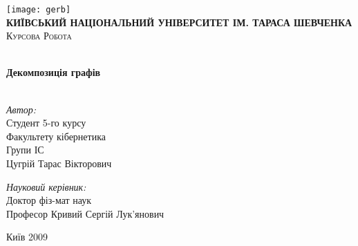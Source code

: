 \begin{titlepage}
  \begin{center}
    
    \texttt{[image: gerb]}\\[1cm]
    
    \textsc{\LARGE \bfseries \MakeUppercase{Київський національний університет ім. Тараса Шевченка}}\\[1.5cm]
    \textsc{\Large Курсова Робота}

    \HRule \\[0.4cm]
           { \huge \bfseries Декомпозиція графів}\\[0.4cm]
           
           \HRule \\[1.5cm]
           
           \begin{minipage}{0.45\textwidth}
             \begin{flushleft} \large
               \emph{Автор:}\\
               Студент 5-го курсу\\
               Факультету кібернетика\\
               Групи ІС\\
               {Ц}угрій {Т}арас {В}ікторович 
             \end{flushleft}
           \end{minipage}
           \begin{minipage}{0.5\textwidth}
             \begin{flushright} \large
               \emph{Науковий керівник:}\\
               Доктор фіз-мат наук\\
               Професор {К}ривий {С}ергій {Л}ук'янович
             \end{flushright}
           \end{minipage}
           
           \vfill
           
           {\large Київ 2009}
           
  \end{center}
  
\end{titlepage}
